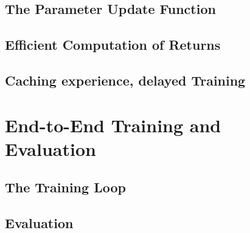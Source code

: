 \subsection{The Parameter Update Function}\label{subsec:ip:agent:training_func}
\subsection{Efficient Computation of Returns}\label{subsec:ip:agnet:return_calc}
\subsection{Caching experience, delayed Training}\label{subsec:ip:agent:archive}
\section{End-to-End Training and Evaluation}\label{sec:ip:training_testing}
\subsection{The Training Loop}\label{subsec:ip:tt:training_loop}
\subsection{Evaluation}\label{subsec:ip:tt:eval}

